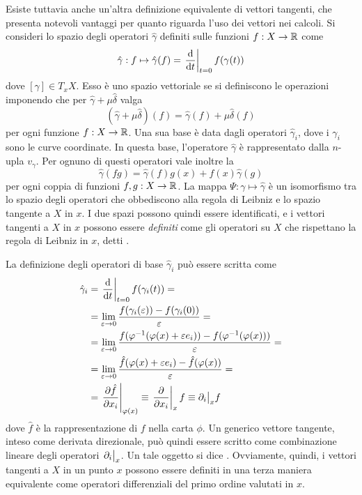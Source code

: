 Esiste tuttavia anche un'altra definizione equivalente di vettori tangenti, che presenta notevoli vantaggi per quanto riguarda l'uso dei vettori nei calcoli. Si consideri lo spazio degli operatori $\hat{\gamma}$ definiti sulle funzioni $f: X \to \mathbb{R}$ come 
\begin{equation*}
  \hat{\gamma}: f \mapsto \hat{\gamma}(f) = \eval{\dv{t}}_{t=0} f(\gamma(t)) 
\end{equation*}
dove $[\gamma] \in T_x X$. Esso è uno spazio vettoriale se si definiscono le operazioni imponendo che per $\hat{\gamma} + \mu \hat{\delta}$ valga 
\begin{equation*}
  (\hat{\gamma} + \mu \hat{\delta}) (f) = \hat{\gamma}(f) + \mu \hat{\delta}(f)
\end{equation*}
per ogni funzione $f:X\to \mathbb{R}$. Una sua base è data dagli operatori $\hat{\gamma}_i$, dove i $\gamma_i$ sono le curve coordinate. In questa base, l'operatore $\hat{\gamma}$ è rappresentato dalla $n$-upla $v_\gamma$. Per ognuno di questi operatori vale inoltre la 
\begin{equation*}
\hat{\gamma}(fg) = \hat{\gamma}(f)g(x) + f(x)\hat{\gamma}(g)
\end{equation*}
per ogni coppia di funzioni $f,g:X\to \mathbb{R}$. La mappa $\Psi: \gamma \mapsto \hat{\gamma}$ è un isomorfismo tra lo spazio degli operatori che obbediscono alla regola di Leibniz e lo spazio tangente a $X$ in $x$. I due spazi possono quindi essere identificati, e i vettori tangenti a $X$ in $x$ possono essere \emph{definiti} come gli operatori su $X$ che rispettano la regola di Leibniz in $x$, detti .

La definizione degli operatori di base $\hat{\gamma}_i$ può essere scritta come \begin{equation*}
\begin{aligned}
  \hat{\gamma}_i &= \eval{\dv{t}}_{t=0} f(\gamma_i(t)) = \\
  &= \lim_{\epsilon \to 0} \frac{f(\gamma_i(\epsilon))-f(\gamma_i(0))}{\epsilon} = \\
  &= \lim_{\epsilon \to 0} \frac{f(\phi^{-1}(\phi(x)+\epsilon e_i))-f(\phi^{-1}(\phi(x)))}{\epsilon} = \\
  &= \lim_{\epsilon \to 0} \frac{\hat{f}(\phi(x)+\epsilon e_i)-\hat{f}(\phi(x))}{\epsilon} = \\
  &= \eval{\pdv{\hat{f}}{x_i}}_{\phi(x)} \equiv \eval{\pdv{x_i}}_x f \equiv \partial_i\big|_x f
\end{aligned}
\end{equation*} 
dove $\hat{f}$ è la rappresentazione di $f$ nella carta $\phi$. Un generico vettore tangente, inteso come derivata direzionale, può quindi essere scritto come combinazione lineare degli operatori $\eval{\partial_i}_x$. Un tale oggetto si dice . Ovviamente, quindi, i vettori tangenti a $X$ in un punto $x$ possono essere definiti in una terza maniera equivalente come operatori differenziali del primo ordine valutati in $x$.

